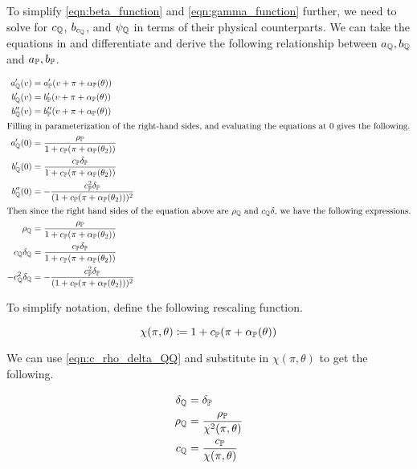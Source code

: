 \documentclass[11pt, letterpaper, twoside, final]{article}
\begin{document}
To simplify \cref{eqn:beta_function} and \cref{eqn:gamma_function} further, we need to solve for $c_{\mathbb{Q}}$,
$b_{c_{\mathbb{Q}}}$, and $\psi_{\mathbb{Q}}$  in terms of their physical counterparts.
We can take the equations in \textcite[Proposition 5]{khrapov2016affine} and differentiate and derive the following
relationship between $a_{\mathbb{Q}}, b_{\mathbb{Q}}$ and $a_{\mathbb{P}}, b_{\mathbb{P}}$.

\begin{align}
    a_{\QQ}'(v) &= a_{\PP}'(v + \pi + \alpha_{\PP}(\theta))  \nonumber \\
%
    b_{\QQ}'(v) &= b_{\PP}'(v + \pi + \alpha_{\PP}(\theta))  \\
%
    b_{\QQ}''(v) &= b_{\PP}''(v + \pi + \alpha_{\PP}(\theta))  \nonumber \\
%
    \intertext{Filling in parameterization of the right-hand sides, and evaluating the equations at $0$ gives the
    following.} 
%
    a_{\QQ}'(0) &= \frac{\rho_{\PP}}{1 + c_{\PP}(\pi + \alpha_{\PP}(\theta_2))} \nonumber \\
%
    b_{\QQ}'(0) &= \frac{c_{\PP} \delta_{\PP}}{1 + c_{\PP}(\pi + \alpha_{\PP}(\theta_2))} \\
%
    b_{\QQ}''(0) &= -\frac{c_{\PP}^2 \delta_{\PP}}{(1 + c_{\PP}(\pi + \alpha_{\PP}(\theta_2)))^2} \nonumber \\
%
    \intertext{Then since the right hand sides of the equation above are $\rho_{\QQ}$ and $c_{\QQ} \delta$, we
    have the following expressions.}
%
    \rho_{\QQ} &= \frac{\rho_{\PP}}{1 + c_{\PP}(\pi + \alpha_{\PP}(\theta_2))} \nonumber \\
%
    \label{eqn:c_rho_delta_QQ}
    c_{\QQ} \delta_{\QQ} &= \frac{c_{\PP} \delta_{\PP}}{1 + c_{\PP}(\pi + \alpha_{\PP}(\theta_2))}  \\
%
    -c_{\QQ}^2 \delta_{\QQ} &= -\frac{c_{\PP}^2 \delta_{\PP}}{(1 + c_{\PP}(\pi + \alpha_{\PP}(\theta_2)))^2}
    \nonumber
\end{align}

To simplify notation, define the following rescaling function.

\begin{equation}
    \chi(\pi, \theta) \coloneqq 1 + c_{\mathbb{P}}(\pi + \alpha_{\mathbb{P}}(\theta))
\end{equation}

We can use \cref{eqn:c_rho_delta_QQ} and substitute in $\chi(\pi, \theta)$ to get the following.

\begin{align}
    \delta_{\mathbb{Q}} &= \delta_{\mathbb{P}} \\
    \rho_{\mathbb{Q}} &= \frac{\rho_{\mathbb{P}}}{\chi^2(\pi, \theta)} \\
    c_{\mathbb{Q}} &= \frac{c_{\mathbb{P}}}{\chi(\pi, \theta)} 
\end{align}
\end{document}
